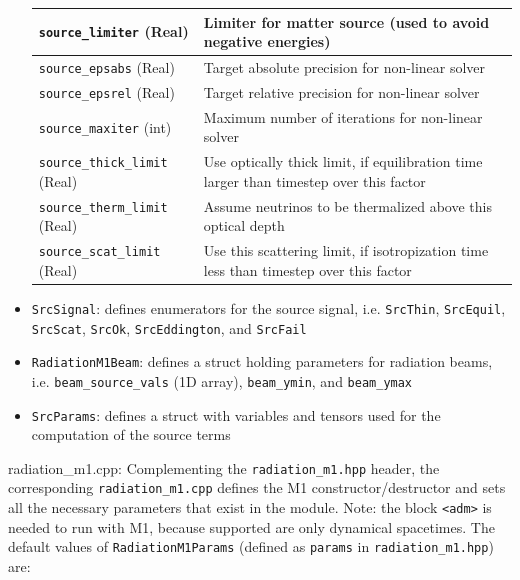 \documentclass{article}
\newcommand{\var}[1]{%
  {\setlength{\fboxsep}{1.5pt}%
   \colorbox{varbg}{\textcolor{varfg}{\texttt{\small #1}}}}}
\begin{document}
\begin{itemize}
\begin{tabularx}{\textwidth}{|l|X|}
    \hline
    \var{source\_limiter} (Real)&Limiter for matter source (used to avoid negative energies)\\
    \hline
    \var{source\_epsabs} (Real)&Target absolute precision for non-linear solver\\
    \hline
    \var{source\_epsrel} (Real)&Target relative precision for non-linear solver\\
    \hline
    \var{source\_maxiter} (int)&Maximum number of iterations for non-linear solver\\
    \hline
    \var{source\_thick\_limit} (Real)&Use optically thick limit, if equilibration time larger than timestep over this factor\\
    \hline
    \var{source\_therm\_limit} (Real)&Assume neutrinos to be thermalized above this optical depth\\
    \hline
    \var{source\_scat\_limit} (Real)&Use this scattering limit, if isotropization time less than timestep over this factor\\
    \hline
  \end{tabularx}
  \item \var{SrcSignal}: defines enumerators for the source signal, i.e. \var{SrcThin}, \var{SrcEquil}, \var{SrcScat}, \var{SrcOk},
  \var{SrcEddington}, and \var{SrcFail}
  \item \var{RadiationM1Beam}: defines a struct holding parameters for radiation beams, i.e. \var{beam\_source\_vals} (1D array),
  \var{beam\_ymin}, and \var{beam\_ymax}
  \item \var{SrcParams}: defines a struct with variables and tensors used for the computation of the source terms
\end{itemize}
{\color{gray}radiation\_m1.cpp:} Complementing the \var{radiation\_m1.hpp} header, the corresponding \var{radiation\_m1.cpp} defines the M1 constructor/destructor and sets all the necessary parameters
that exist in the module. Note: the block \var{<adm>} is needed to run with M1, because supported are only dynamical spacetimes. The default values of
\var{RadiationM1Params} (defined as \var{params} in \var{radiation\_m1.hpp}) are:
\end{document}

